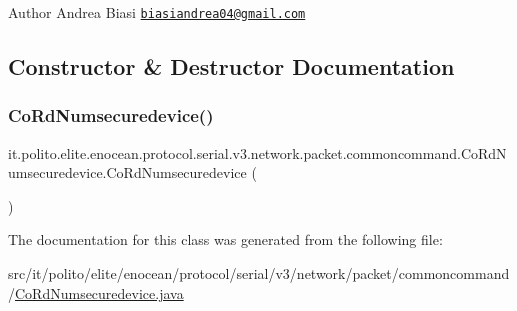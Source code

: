 \begin{DoxyAuthor}{Author}
Andrea Biasi \href{mailto:biasiandrea04@gmail.com}{\tt biasiandrea04@gmail.\+com} 
\end{DoxyAuthor}


\subsection{Constructor \& Destructor Documentation}
\hypertarget{classit_1_1polito_1_1elite_1_1enocean_1_1protocol_1_1serial_1_1v3_1_1network_1_1packet_1_1common6fb957e7f7a5690155483692373a4fc5_a9dd4b06e869ecfefb484a94d56be46f9}{}\label{classit_1_1polito_1_1elite_1_1enocean_1_1protocol_1_1serial_1_1v3_1_1network_1_1packet_1_1common6fb957e7f7a5690155483692373a4fc5_a9dd4b06e869ecfefb484a94d56be46f9} 
\subsubsection{\texorpdfstring{Co\+Rd\+Numsecuredevice()}{CoRdNumsecuredevice()}}
{\footnotesize\ttfamily it.\+polito.\+elite.\+enocean.\+protocol.\+serial.\+v3.\+network.\+packet.\+commoncommand.\+Co\+Rd\+Numsecuredevice.\+Co\+Rd\+Numsecuredevice (\begin{DoxyParamCaption}{ }\end{DoxyParamCaption})}



The documentation for this class was generated from the following file\+:\begin{DoxyCompactItemize}
\item 
src/it/polito/elite/enocean/protocol/serial/v3/network/packet/commoncommand/\hyperlink{_co_rd_numsecuredevice_8java}{Co\+Rd\+Numsecuredevice.\+java}\end{DoxyCompactItemize}
